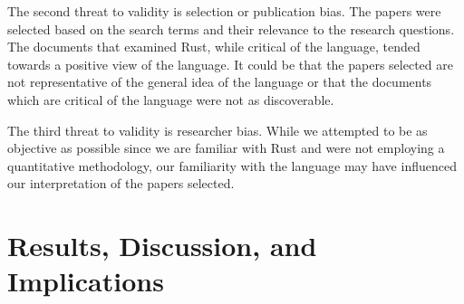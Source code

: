 \documentclass[conference]{IEEEtran}
\begin{document}
The second threat to validity is selection or publication bias. The papers were selected based on the search terms and their relevance to the research questions. The documents that examined Rust, while critical of the language, tended towards a positive view of the language. It could be that the papers selected are not representative of the general idea of the language or that the documents which are critical of the language were not as discoverable.

The third threat to validity is researcher bias. While we attempted to be as objective as possible since we are familiar with Rust and were not employing a quantitative methodology, our familiarity with the language may have influenced our interpretation of the papers selected.

\section{Results, Discussion, and Implications}
\label{results}
\end{document}

